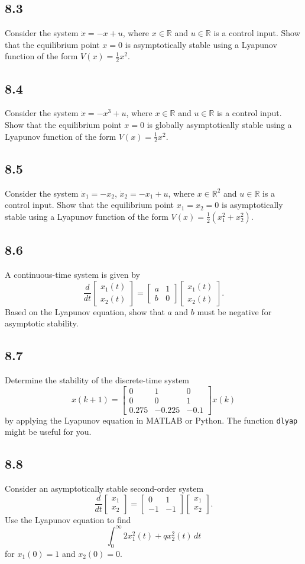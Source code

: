 \documentclass{article}
\newcommand{\problem}[2]{\subsection*{#1}}
\begin{document}
\problem{8.3}{lyapunov-function-drills}
Consider the system $\dot{x} = -x + u$, where $x \in \mathbb{R}$ and $u \in \mathbb{R}$ is a control input. Show that the equilibrium point $x = 0$ is asymptotically stable using a Lyapunov function of the form $V(x) = \frac{1}{2}x^2$.

\problem{8.4}{lyapunov-function-drills}
Consider the system $\dot{x} = -x^3 + u$, where $x \in \mathbb{R}$ and $u \in \mathbb{R}$ is a control input. Show that the equilibrium point $x = 0$ is globally asymptotically stable using a Lyapunov function of the form $V(x) = \frac{1}{2}x^2$.

\problem{8.5}{lyapunov-function-drills}
Consider the system $\dot{x}_1 = -x_2$, $\dot{x}_2 = -x_1 + u$, where $x \in \mathbb{R}^2$ and $u \in \mathbb{R}$ is a control input. Show that the equilibrium point $x_1 = x_2 = 0$ is asymptotically stable using a Lyapunov function of the form $V(x) = \frac{1}{2}(x_1^2 + x_2^2)$.

\problem{8.6}{}
A continuous-time system is given by
\[
\frac{d}{dt}\begin{bmatrix} x_1(t) \\ x_2(t) \end{bmatrix} =
\begin{bmatrix} a & 1 \\ b & 0 \end{bmatrix}
\begin{bmatrix} x_1(t) \\ x_2(t) \end{bmatrix}.
\]
Based on the Lyapunov equation, show that $a$ and $b$ must be negative for asymptotic stability.

\problem{8.7}{}
Determine the stability of the discrete-time system
\[
x(k + 1) = \begin{bmatrix} 0 & 1 & 0 \\ 0 & 0 & 1 \\ 0.275 & -0.225 & -0.1 \end{bmatrix} x(k)
\]
by applying the Lyapunov equation in MATLAB or Python. The function \texttt{dlyap} might be useful for you.

\problem{8.8}{}
Consider an asymptotically stable second-order system
\[
\frac{d}{dt}\begin{bmatrix} x_1 \\ x_2 \end{bmatrix} =
\begin{bmatrix} 0 & 1 \\ -1 & -1 \end{bmatrix}
\begin{bmatrix} x_1 \\ x_2 \end{bmatrix}.
\]
Use the Lyapunov equation to find
\[
\int_0^{\infty} 2x_1^2(t) + qx_2^2(t)\,dt
\]
for $x_1(0) = 1$ and $x_2(0) = 0$.
\end{document}
